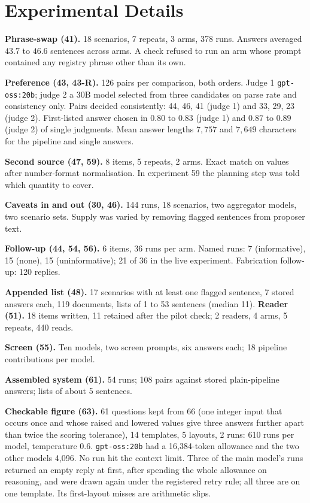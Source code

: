\documentclass[10pt,twocolumn]{article}
\begin{document}
\section{Experimental Details}
\label{app:details}

\textbf{Phrase-swap (41).} 18 scenarios, 7 repeats, 3 arms, 378 runs.
Answers averaged $43.7$ to $46.6$ sentences across arms. A check
refused to run an arm whose prompt contained any registry phrase other
than its own.

\textbf{Preference (43, 43-R).} 126 pairs per comparison, both orders.
Judge 1 \texttt{gpt-oss:20b}; judge 2 a 30B model selected from three
candidates on parse rate and consistency only. Pairs decided
consistently: 44, 46, 41 (judge 1) and 33, 29, 23 (judge 2).
First-listed answer chosen in $0.80$ to $0.83$ (judge 1) and $0.87$ to
$0.89$ (judge 2) of single judgments. Mean answer lengths $7{,}757$ and
$7{,}649$ characters for the pipeline and single answers.

\textbf{Second source (47, 59).} 8 items, 5 repeats, 2 arms. Exact
match on values after number-format normalisation. In experiment 59 the
planning step was told which quantity to cover.

\textbf{Caveats in and out (30, 46).} 144 runs, 18 scenarios, two
aggregator models, two scenario sets. Supply was varied by removing
flagged sentences from proposer text.

\textbf{Follow-up (44, 54, 56).} 6 items, 36 runs per arm. Named runs:
7 (informative), 15 (none), 15 (uninformative); 21 of 36 in the live
experiment. Fabrication follow-up: 120 replies.

\textbf{Appended list (48).} 17 scenarios with at least one flagged
sentence, 7 stored answers each, 119 documents, lists of 1 to 53
sentences (median 11). \textbf{Reader (51).} 18 items written, 11
retained after the pilot check; 2 readers, 4 arms, 5 repeats, 440
reads.

\textbf{Screen (55).} Ten models, two screen prompts, six answers each;
18 pipeline contributions per model.

\textbf{Assembled system (61).} 54 runs; 108 pairs against stored
plain-pipeline answers; lists of about 5 sentences.

\textbf{Checkable figure (63).} 61 questions kept from 66 (one integer
input that occurs once and whose raised and lowered values give three
answers further apart than twice the scoring tolerance), 14 templates,
5 layouts, 2 runs: 610 runs per model, temperature $0.6$.
\texttt{gpt-oss:20b} had a 16{,}384-token allowance and the two other
models 4{,}096. No run hit the context limit. Three of the main model's
runs returned an empty reply at first, after spending the whole
allowance on reasoning, and were drawn again under the registered retry
rule; all three are on one template. Its first-layout misses are
arithmetic slips.
\end{document}
